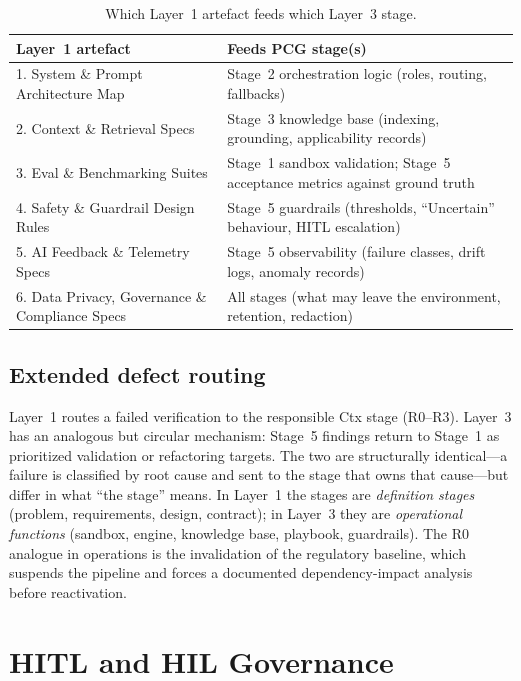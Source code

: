 \documentclass[11pt,a4paper]{article}
\begin{document}
\begin{table}[htbp]
\centering
\caption{Which Layer~1 artefact feeds which Layer~3 stage.}
\label{tab:mapping}
\small
\begin{tabular}{@{}lp{9.6cm}@{}}
\toprule
\textbf{Layer~1 artefact} & \textbf{Feeds PCG stage(s)} \\
\midrule
1. System \& Prompt Architecture Map & Stage~2 orchestration logic (roles, routing, fallbacks) \\
2. Context \& Retrieval Specs & Stage~3 knowledge base (indexing, grounding, applicability records) \\
3. Eval \& Benchmarking Suites & Stage~1 sandbox validation; Stage~5 acceptance metrics against ground truth \\
4. Safety \& Guardrail Design Rules & Stage~5 guardrails (thresholds, ``Uncertain'' behaviour, HITL escalation) \\
5. AI Feedback \& Telemetry Specs & Stage~5 observability (failure classes, drift logs, anomaly records) \\
6. Data Privacy, Governance \& Compliance Specs & All stages (what may leave the environment, retention, redaction) \\
\bottomrule
\end{tabular}
\end{table}

\subsection{Extended defect routing}
\label{sec:extended}

Layer~1 routes a failed verification to the responsible Ctx stage (R0--R3). Layer~3 has an
analogous but circular mechanism: Stage~5 findings return to Stage~1 as prioritized validation
or refactoring targets. The two are structurally identical---a failure is classified by root
cause and sent to the stage that owns that cause---but differ in what ``the stage'' means. In
Layer~1 the stages are \emph{definition stages} (problem, requirements, design, contract); in
Layer~3 they are \emph{operational functions} (sandbox, engine, knowledge base, playbook,
guardrails). The R0 analogue in operations is the invalidation of the regulatory baseline, which
suspends the pipeline and forces a documented dependency-impact analysis before reactivation.

\section{HITL and HIL Governance}
\label{sec:governance}
\end{document}
